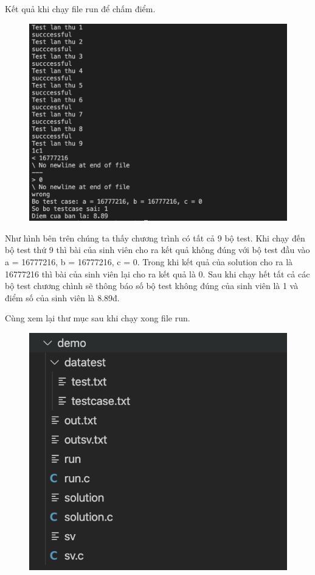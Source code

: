 \documentclass[12pt,a4paper]{article}
\begin{document}
Kết quả khi chạy file run để chấm điểm.

\begin{figure}[ht]
\begin{center}
\includegraphics[scale=.3]{hinhanh/ketquademo.png}
\end{center}
\end{figure}

Như hình bên trên chúng ta thấy chương trình có tất cả 9 bộ test. Khi chạy đến bộ test thứ 9 thì bài của sinh viên cho ra kết  quả không đúng với bộ test đầu vào a = 16777216, b = 16777216, c = 0. Trong khi kết quả của solution cho ra là 16777216 thì bài của sinh viên lại cho ra kết quả là 0. Sau khi chạy hết tất cả các bộ test chương chình sẽ thông báo số bộ test không đúng của sinh viên là 1 và điểm số của sinh viên là 8.89đ.

Cùng xem lại thư mục sau khi chạy xong file run.

\begin{figure}[ht]
\begin{center}
\includegraphics[scale=.3]{hinhanh/cautrucsauchayrun.png}
\end{center}
\end{figure}
\end{document}
